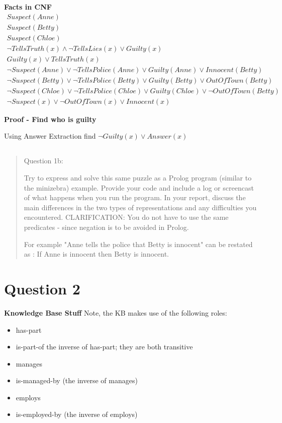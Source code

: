 \documentclass[11pt]{article}
\begin{document}
\large \textbf{Facts in CNF}
\begin{align}
Suspect(Anne) \\
Suspect(Betty) \\
Suspect(Chloe) \\ 
\lnot TellsTruth(x) \land \lnot TellsLies(x) \lor Guilty(x) \\ 
Guilty(x) \lor TellsTruth(x) \\ 
\lnot Suspect(Anne) \lor \lnot TellsPolice(Anne) \lor Guilty(Anne) \lor Innocent(Betty) \\
\lnot Suspect(Betty) \lor \lnot TellsPolice(Betty) \lor Guilty(Betty)  \lor OutOfTown(Betty) \\
\lnot Suspect(Chloe) \lor \lnot TellsPolice(Chloe) \lor Guilty(Chloe) \lor \lnot OutOfTown(Betty) \\
\lnot Suspect(x) \lor \lnot OutOfTown(x) \lor Innocent(x)
\end{align}

\textbf{Proof - Find who is guilty}

Using Answer Extraction find $\lnot Guilty(x) \lor Answer(x)$



\subsection{}
\begin{quote}
Question 1b:

Try to express and solve this same puzzle as a Prolog program (similar to the minizebra) example. Provide your code and include a log or screencast of what happens when you run the program. In your report, discuss the main differences in the two types of representations and any difficulties you encountered.
CLARIFICATION: You do not have to use the same predicates - since negation is to be avoided in Prolog.

For example  "Anne tells the police that Betty is innocent"  can be restated as : If Anne is innocent then Betty is innocent.
\end{quote}

\section{Question 2}
\textbf{Knowledge Base Stuff} 
Note, the KB makes use of the following roles:

\begin{itemize}
    \item[] has-part
    \item[] is-part-of the inverse of has-part; they are both transitive
    \item[] manages
    \item[] is-managed-by (the inverse of manages)
    \item[] employs
    \item[] is-employed-by (the inverse of employs)
\end{itemize}
\end{document}
